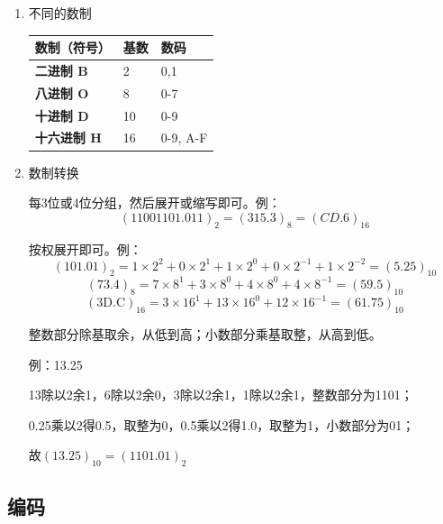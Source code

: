\documentclass[UTF8,fontset=fandol,zihao=5]{ctexart}
\begin{document}
\begin{enumerate}
  \item 不同的数制
  \begin{center}
    \begin{tabularx}{0.92\textwidth}{>{\bfseries}p{2.5cm}X X}
      \toprule
      数制（符号） & 基数 & 数码 \\
      \midrule
      二进制 B & 2 & 0,1 \\
      八进制 O & 8 & 0-7 \\
      十进制 D & 10 & 0-9 \\
      十六进制 H & 16 & 0-9, A-F \\
      \bottomrule
    \end{tabularx}
  \end{center}

  \item 数制转换
\begin{methodbox}[非十进制互转]
每3位或4位分组，然后展开或缩写即可。例：
\[
\left ( 11001101.011 \right )_2 = \left ( 315.3 \right )_8 = \left ( CD.6 \right )_{16}
\]
\end{methodbox}

\begin{methodbox}[非十进制转十进制]
按权展开即可。例：
\[
\left ( 101.01 \right )_2 = 1 \times 2^2 + 0 \times 2^1 + 1 \times 2^0 + 0 \times 2^{-1} + 1 \times 2^{-2} = (5.25)_{10}
\]
\[
\left ( 73.4 \right )_8 = 7 \times 8^1 + 3 \times 8^0 + 4 \times 8^0 + 4 \times 8^{-1} = (59.5)_{10}
\]
\[
\left ( 3\mathrm{D}.\mathrm{C} \right )_{16} = 3 \times 16^1 + 13 \times 16^0 + 12 \times 16^{-1} = (61.75)_{10}
\]
\end{methodbox}

\begin{methodbox}[十进制转非十进制]
整数部分除基取余，从低到高；小数部分乘基取整，从高到低。

例：13.25

13除以2余1，6除以2余0，3除以2余1，1除以2余1，整数部分为1101；

0.25乘以2得0.5，取整为0，0.5乘以2得1.0，取整为1，小数部分为01；

故$(13.25)_{10} = \left ( 1101.01 \right )_2$
\end{methodbox}
\end{enumerate}

\subsection{编码}
\end{document}
